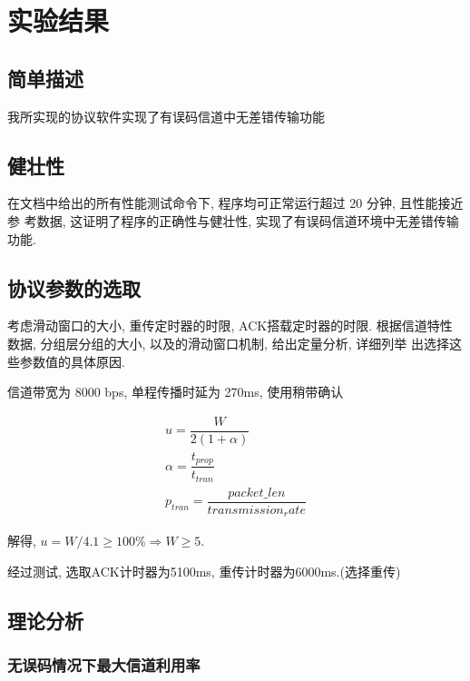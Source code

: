 \section{实验结果}

\subsection{简单描述}

我所实现的协议软件实现了有误码信道中无差错传输功能

\subsection{健壮性}

\par 在文档中给出的所有性能测试命令下, 程序均可正常运行超过 20 分钟, 且性能接近参
考数据, 这证明了程序的正确性与健壮性, 实现了有误码信道环境中无差错传输功能.

\subsection{协议参数的选取}

\par 考虑滑动窗口的大小, 重传定时器的时限, ACK搭载定时器的时限.
根据信道特性数据, 分组层分组的大小, 以及的滑动窗口机制, 给出定量分析, 详细列举
出选择这些参数值的具体原因.

\par 信道带宽为 8000 bps, 单程传播时延为 270ms, 使用稍带确认

\begin{align*}
  u = \dfrac{W}{2(1 + \alpha)}        \\
  \alpha = \dfrac{t_{prop}}{t_{tran}} \\
  p_{tran} = \dfrac{packet\_len}{transmission_rate}
\end{align*}

解得, $u = W / 4.1 \geqslant 100\% \Rightarrow W \geqslant 5$.

\par 经过测试, 选取ACK计时器为5100ms, 重传计时器为6000ms.(选择重传)
\subsection{理论分析}

\subsubsection{无误码情况下最大信道利用率}

